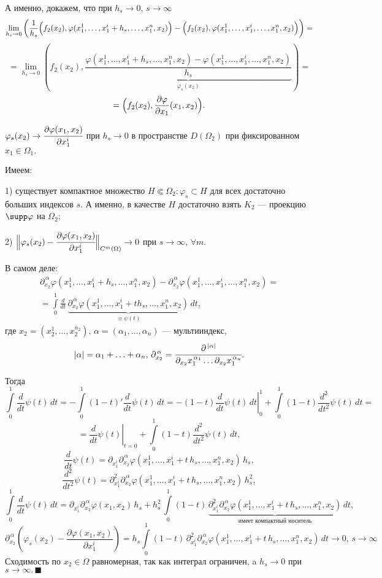 \documentclass[12pt,a4paper,draft]{article}
\DeclareRobustCommand*{\т}{~--- }
\DeclareRobustCommand*{\ч}{~-- }
\begin{document}
А именно, докажем, что при $h_s\to0,\,s\to\infty$
$$\lim_{h_s\to0} \left(\frac1{h_s}\Bigl(f_2(x_2),\varphi(x_1^1,\ldots,x_1^i+h_s,\ldots,x_1^n,x_2)\Bigr)-
\Bigl(f_2(x_2),\varphi(x_1^1,\ldots,x_1^i,\ldots,x_1^n,x_2)\Bigr)\right)=$$
$$=\lim_{h_s\to0}
\left(f_2(x_2),\underbrace{\frac{\varphi(x_1^1,\ldots,x_1^i+h_s,\ldots,x_1^n,x_2)-\varphi(x_1^1,\ldots,x_1^i,\ldots,x_1^n,x_2)}{h_s}}_{\varphi_s(x_2)}\right)=$$
$$=\Bigl(f_2(x_2),\frac{\partial\varphi}{\partial
x_1}(x_1,x_2)\Bigr).$$

$\varphi_s(x_2)\to \cfrac{\partial \varphi(x_1,x_2)}{\partial
x_1^i}$ при $h_s\to0$ в пространстве $D(\Omega_2)$ при
фиксированном $x_1\in\Omega_1.$

Имеем:

1) существует компактное множество $H\Subset\Omega_2\colon
\varphi_s\subset H$ для всех достаточно больших индексов $s$. А
именно, в качестве $H$ достаточно взять $K_2$ --- проекцию $\supp
\varphi$ на $\Omega_2$;

2) $\Bigl\|\varphi_s(x_2)-\cfrac{\partial
\varphi(x_1,x_2)}{\partial x_1^i}\Bigr\|_{C^m(\Omega)}\to0$ при
$s\to\infty,\,\forall m.$

В самом деле:
\begin{multline}
\partial^{\,\alpha}_{x_2}\varphi(x_1^1,\ldots,x_1^i+h_s,\ldots,x_1^n,x_2)-
\partial^{\,\alpha}_{x_2}\varphi(x_1^1,\ldots,x_1^i,\ldots,x_1^n,x_2)=\\=
\int\limits_0^1\frac
d{dt}\,\underbrace{\partial^{\,\alpha}_{x_2}\varphi(x_1^1,\ldots,x_1^i+t
h_s,\ldots,x_1^n,x_2)}_{\equiv \psi(t)}\,dt,
\end{multline}
где
$x_2=(x_2^1,\ldots,x_2^{n_2}),\,\alpha=(\alpha_1,\ldots,\alpha_n)$
--- мультииндекс,
$$|\alpha|=\alpha_1+\ldots+\alpha_n,
\,\partial_{x_2}^{\,\alpha}=\cfrac
{\partial^{\,|\alpha|}}{\partial_{x_2} x_1^{\,\alpha_1}\ldots
\partial_{x_2} x_1^{\,\alpha_n}}.$$

Тогда $$\int\limits_0^1\frac
d{dt}\psi(t)\,dt=-\int\limits_0^1(1-t)'\frac
d{dt}\psi(t)\,dt=-\left.(1-t)\frac d{dt}\psi(t)\,dt\right|_0^1+
\int\limits_0^1(1-t)\frac {d^2}{dt^2}\psi(t)\,dt=$$
$$=\left.\frac d{dt}\psi(t)\right|_{t=0}+
\int\limits_0^1(1-t)\frac {d^2}{dt^2}\psi(t)\,dt,$$
$$\frac d{dt}\psi(t)=\partial_{x_1^i} \partial_{x_2}^{\,\alpha} \varphi (x_1^1,\ldots,x_1^i+t\,h_s,\ldots,x_1^n,x_2)\,h_s,$$
$$\frac {d^2}{dt^2}\psi(t)=\partial^2_{x_1^i} \partial_{x_2}^{\,\alpha} \varphi (x_1^1,\ldots,x_1^i+t\,h_s,\ldots,x_1^n,x_2)\,h_s^2,$$
$$\int\limits_0^1\frac d{dt}\psi(t)\,dt=\partial_{x_1^i} \partial_{x_2}^{\,\alpha} \varphi (x_1,x_2)\,h_s+
h_s^2\,\int\limits_0^1(1-t)\,\underbrace{\partial_{x_1^i}^2
\partial_{x_2}^{\,\alpha} \varphi (x_1^1,\ldots,x_1^i+t\,
h_s,\ldots,x_1^n,x_2)}_{\mbox{имеет компактный носитель}} \,dt,$$
$$\partial_{x_2}^{\,\alpha}\left(\varphi_s (x_2)-\frac{\partial\varphi(x_1,x_2)}{\partial x_1^i}\right)=
h_s\int\limits_0^1(1-t)\,\partial_{x_1^i}^2\partial_{x_2}^{\,\alpha}\varphi(x_1^1,\ldots,x_1^i+t\,h_s,\ldots,x_1^n,x_2)\,dt\to0,
\,s\to\infty$$ Сходимость по $x_2\in\Omega$ равномерная, так как
интеграл ограничен, a $h_s\to0$ при $s\to\infty.\,\blacksquare$
\end{document}
